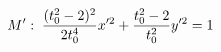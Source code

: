 \documentclass[preview]{standalone}
\begin{document}
\begin{align*}
\special{dvisvgm:raw <g id='unique000'>}M':\; \frac{(t_0^2-2)^2}{2t_0^4}x'^2+\frac{t_0^2-2}{t_0^2}y'^2=1\special{dvisvgm:raw </g>}
\end{align*}
\end{document}
